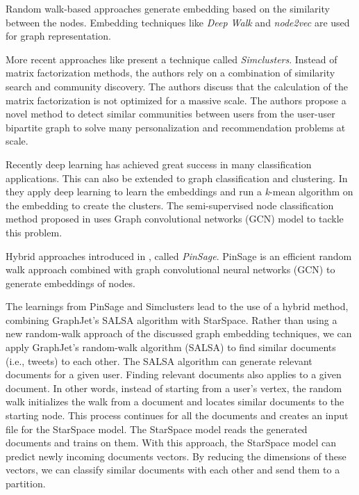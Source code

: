 Random walk-based approaches generate embedding based on the similarity between the nodes. Embedding techniques like \emph{Deep Walk} \cite{perozziDeepWalkOnlineLearning2014} and \emph{node2vec} \cite{groverNode2vecScalableFeature2016} are used for graph representation.


More recent approaches like \cite{satuluriSimClustersCommunityBasedRepresentations2020a} present a technique called \emph{Simclusters}. Instead of matrix factorization methods, the authors rely on a combination of similarity search and community discovery. The authors discuss that the calculation of the matrix factorization is not optimized for a massive scale. The authors propose a novel method to detect similar communities between users from the user-user bipartite graph to solve many personalization and recommendation problems at scale.


Recently deep learning has achieved great success in many classification applications. This can also be extended to graph classification and clustering. In \cite{tianLearningDeepRepresentations2014} they apply deep learning to learn the embeddings and run a \emph{k}-mean algorithm on the embedding to create the clusters. The semi-supervised node classification method proposed in \cite{kipfSemiSupervisedClassificationGraph2017} uses Graph convolutional networks (GCN) model to tackle this problem. 

Hybrid approaches introduced in \cite{yingGraphConvolutionalNeural2018}, called \emph{PinSage}. PinSage is an efficient random walk approach combined with graph convolutional neural networks (GCN) to generate embeddings of nodes.


The learnings from PinSage and Simclusters lead to the use of a hybrid method, combining GraphJet's SALSA algorithm with StarSpace. Rather than using a new random-walk approach of the discussed graph embedding techniques, we can apply GraphJet's random-walk algorithm (SALSA) to find similar documents (i.e., tweets) to each other. The SALSA algorithm can generate relevant documents for a given user. Finding relevant documents also applies to a given document. In other words, instead of starting from a user's vertex, the random walk initializes the walk from a document and locates similar documents to the starting node. This process continues for all the documents and creates an input file for the StarSpace model. The StarSpace model reads the generated documents and trains on them. With this approach, the StarSpace model can predict newly incoming documents vectors. By reducing the dimensions of these vectors, we can classify similar documents with each other and send them to a partition. 
